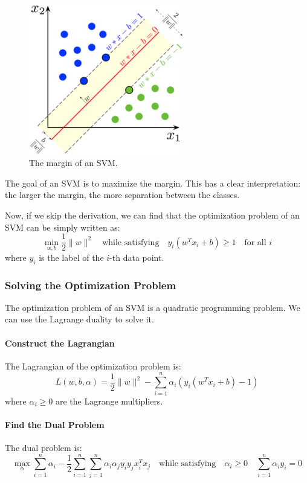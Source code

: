 \documentclass[a4paper,12pt]{article}
\begin{document}
\begin{figure}[H]
  \centering
  \includegraphics[width=0.6\textwidth]{figure/SVM_margin.png}
  \caption{The margin of an SVM.}  
\end{figure}

The goal of an SVM is to maximize the margin. This has a clear interpretation: the larger the margin, the more separation between the classes.

Now, if we skip the derivation, we can find that the optimization problem of an SVM can be simply written as:
\begin{equation*}
  \min_{w, b} \frac{1}{2} \|w\|^2 \quad \text{while satisfying} \quad y_i (w^T x_i + b) \geq 1 \quad \text{for all } i
\end{equation*}
where $y_i$ is the label of the $i$-th data point.

\subsubsection{Solving the Optimization Problem}


The optimization problem of an SVM is a quadratic programming problem. We can use the Lagrange duality to solve it.

\paragraph{Construct the Lagrangian} The Lagrangian of the optimization problem is:
\begin{equation*}
  L(w, b, \alpha) = \frac{1}{2} \|w\|^2 - \sum_{i=1}^{n} \alpha_i (y_i (w^T x_i + b) - 1)
\end{equation*}
where $\alpha_i \geq 0$ are the Lagrange multipliers.

\paragraph{Find the Dual Problem} The dual problem is:
\begin{equation*}
  \max_{\alpha} \sum_{i=1}^{n} \alpha_i - \frac{1}{2} \sum_{i=1}^{n} \sum_{j=1}^{n} \alpha_i \alpha_j y_i y_j x_i^T x_j \quad \text{while satisfying} \quad \alpha_i \geq 0 \quad \sum_{i=1}^{n} \alpha_i y_i = 0 
\end{equation*}
\end{document}
